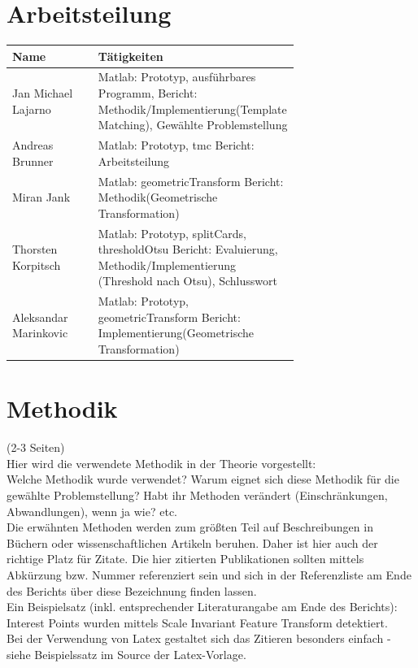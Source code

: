 \documentclass[paper=A4, deutsch]{scrartcl}
\begin{document}
\section{Arbeitsteilung}
\begin{center}
  \begin{tabular}{ |l |p{0.7\linewidth} | }
    \hline
  Name & Tätigkeiten\\
    \hline
		Jan Michael Lajarno & Matlab: Prototyp, ausführbares Programm, \newline Bericht: Methodik/Implementierung(Template Matching), Gewählte Problemstellung\\
		\hline
		Andreas Brunner & Matlab: Prototyp, tmc \newline Bericht: Arbeitsteilung\\
		\hline
		Miran Jank & Matlab: geometricTransform \newline Bericht: Methodik(Geometrische Transformation)\\
		\hline
		Thorsten Korpitsch & Matlab: Prototyp, splitCards, thresholdOtsu \newline Bericht: Evaluierung, Methodik/Implementierung (Threshold nach Otsu), Schlusswort\\
		\hline
		Aleksandar Marinkovic & Matlab: Prototyp, geometricTransform \newline Bericht: Implementierung(Geometrische Transformation)\\ 
		\hline
  \end{tabular}
\end{center}


\section{Methodik}
(2-3 Seiten)\\
Hier wird die verwendete Methodik in der Theorie vorgestellt:\\
Welche Methodik wurde verwendet? Warum eignet sich diese Methodik für die gewählte Problemstellung? Habt ihr Methoden verändert (Einschränkungen, Abwandlungen), wenn ja wie? etc.\\
Die erwähnten Methoden werden zum größten Teil auf Beschreibungen in Büchern oder wissenschaftlichen Artikeln beruhen. Daher ist hier auch der richtige Platz für Zitate. Die hier zitierten Publikationen sollten mittels Abkürzung bzw. Nummer referenziert sein und sich in der Referenzliste am Ende des Berichts über diese Bezeichnung finden lassen.\\
Ein Beispielsatz (inkl. entsprechender Literaturangabe am Ende des Berichts): Interest Points wurden mittels Scale Invariant Feature Transform detektiert.\\
Bei der Verwendung von Latex gestaltet sich das Zitieren besonders einfach - siehe Beispielssatz im Source der Latex-Vorlage.\\
\end{document}
